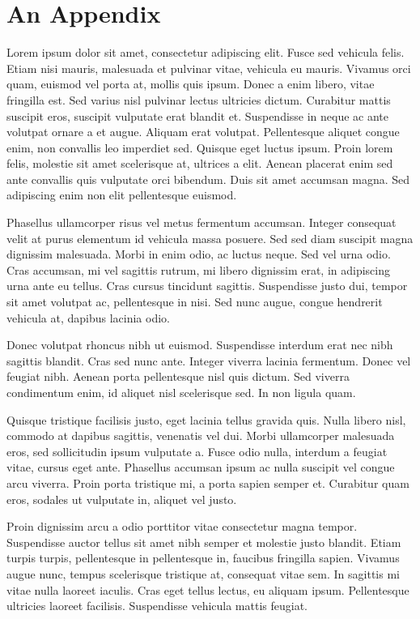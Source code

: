 \appendix
\chapter{An Appendix}

Lorem ipsum dolor sit amet, consectetur adipiscing elit. Fusce sed vehicula felis. Etiam nisi mauris, malesuada et pulvinar vitae, vehicula eu mauris. Vivamus orci quam, euismod vel porta at, mollis quis ipsum. Donec a enim libero, vitae fringilla est. Sed varius nisl pulvinar lectus ultricies dictum. Curabitur mattis suscipit eros, suscipit vulputate erat blandit et. Suspendisse in neque ac ante volutpat ornare a et augue. Aliquam erat volutpat. Pellentesque aliquet congue enim, non convallis leo imperdiet sed. Quisque eget luctus ipsum. Proin lorem felis, molestie sit amet scelerisque at, ultrices a elit. Aenean placerat enim sed ante convallis quis vulputate orci bibendum. Duis sit amet accumsan magna. Sed adipiscing enim non elit pellentesque euismod.

Phasellus ullamcorper risus vel metus fermentum accumsan. Integer consequat velit at purus elementum id vehicula massa posuere. Sed sed diam suscipit magna dignissim malesuada. Morbi in enim odio, ac luctus neque. Sed vel urna odio. Cras accumsan, mi vel sagittis rutrum, mi libero dignissim erat, in adipiscing urna ante eu tellus. Cras cursus tincidunt sagittis. Suspendisse justo dui, tempor sit amet volutpat ac, pellentesque in nisi. Sed nunc augue, congue hendrerit vehicula at, dapibus lacinia odio.

Donec volutpat rhoncus nibh ut euismod. Suspendisse interdum erat nec nibh sagittis blandit. Cras sed nunc ante. Integer viverra lacinia fermentum. Donec vel feugiat nibh. Aenean porta pellentesque nisl quis dictum. Sed viverra condimentum enim, id aliquet nisl scelerisque sed. In non ligula quam.

Quisque tristique facilisis justo, eget lacinia tellus gravida quis. Nulla libero nisl, commodo at dapibus sagittis, venenatis vel dui. Morbi ullamcorper malesuada eros, sed sollicitudin ipsum vulputate a. Fusce odio nulla, interdum a feugiat vitae, cursus eget ante. Phasellus accumsan ipsum ac nulla suscipit vel congue arcu viverra. Proin porta tristique mi, a porta sapien semper et. Curabitur quam eros, sodales ut vulputate in, aliquet vel justo.

Proin dignissim arcu a odio porttitor vitae consectetur magna tempor. Suspendisse auctor tellus sit amet nibh semper et molestie justo blandit. Etiam turpis turpis, pellentesque in pellentesque in, faucibus fringilla sapien. Vivamus augue nunc, tempus scelerisque tristique at, consequat vitae sem. In sagittis mi vitae nulla laoreet iaculis. Cras eget tellus lectus, eu aliquam ipsum. Pellentesque ultricies laoreet facilisis. Suspendisse vehicula mattis feugiat.
